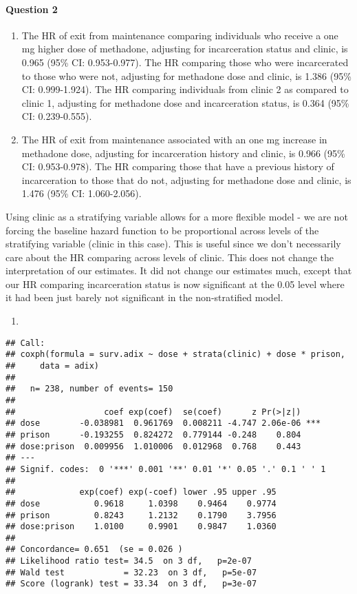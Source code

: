 \documentclass[]{article}
\let\oldparagraph\paragraph
\renewcommand{\paragraph}[1]{\oldparagraph{#1}\mbox{}}
\begin{document}
\newpage

\paragraph{Question 2}\label{question-2}

\begin{enumerate}
\def\labelenumi{(\alph{enumi})}
\item
  The HR of exit from maintenance comparing individuals who receive a
  one mg higher dose of methadone, adjusting for incarceration status
  and clinic, is 0.965 (95\% CI: 0.953-0.977). The HR comparing those
  who were incarcerated to those who were not, adjusting for methadone
  dose and clinic, is 1.386 (95\% CI: 0.999-1.924). The HR comparing
  individuals from clinic 2 as compared to clinic 1, adjusting for
  methadone dose and incarceration status, is 0.364 (95\% CI:
  0.239-0.555).
\item
  The HR of exit from maintenance associated with an one mg increase in
  methadone dose, adjusting for incarceration history and clinic, is
  0.966 (95\% CI: 0.953-0.978). The HR comparing those that have a
  previous history of incarceration to those that do not, adjusting for
  methadone dose and clinic, is 1.476 (95\% CI: 1.060-2.056).
\end{enumerate}

Using clinic as a stratifying variable allows for a more flexible model
- we are not forcing the baseline hazard function to be proportional
across levels of the stratifying variable (clinic in this case). This is
useful since we don't necessarily care about the HR comparing across
levels of clinic. This does not change the interpretation of our
estimates. It did not change our estimates much, except that our HR
comparing incarceration status is now significant at the 0.05 level
where it had been just barely not significant in the non-stratified
model.

\begin{enumerate}
\def\labelenumi{(\alph{enumi})}
\setcounter{enumi}{2}
\item
\end{enumerate}

\begin{verbatim}
## Call:
## coxph(formula = surv.adix ~ dose + strata(clinic) + dose * prison, 
##     data = adix)
## 
##   n= 238, number of events= 150 
## 
##                  coef exp(coef)  se(coef)      z Pr(>|z|)    
## dose        -0.038981  0.961769  0.008211 -4.747 2.06e-06 ***
## prison      -0.193255  0.824272  0.779144 -0.248    0.804    
## dose:prison  0.009956  1.010006  0.012968  0.768    0.443    
## ---
## Signif. codes:  0 '***' 0.001 '**' 0.01 '*' 0.05 '.' 0.1 ' ' 1
## 
##             exp(coef) exp(-coef) lower .95 upper .95
## dose           0.9618     1.0398    0.9464    0.9774
## prison         0.8243     1.2132    0.1790    3.7956
## dose:prison    1.0100     0.9901    0.9847    1.0360
## 
## Concordance= 0.651  (se = 0.026 )
## Likelihood ratio test= 34.5  on 3 df,   p=2e-07
## Wald test            = 32.23  on 3 df,   p=5e-07
## Score (logrank) test = 33.34  on 3 df,   p=3e-07
\end{verbatim}
\end{document}
